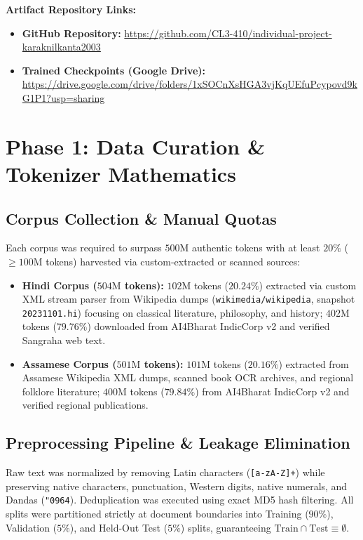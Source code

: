 \documentclass[11pt,a4paper]{article}
\begin{document}
\vspace{0.3em}
\noindent\textbf{Artifact Repository Links:}
\begin{itemize}[noitemsep,topsep=0pt]
    \item \textbf{GitHub Repository:} \url{https://github.com/CL3-410/individual-project-karaknilkanta2003}
    \item \textbf{Trained Checkpoints (Google Drive):} \url{https://drive.google.com/drive/folders/1xSOCnXsHGA3vjKqUEfuPcypovd9kG1P1?usp=sharing}
\end{itemize}

\vspace{0.5em}

\section{Phase 1: Data Curation \& Tokenizer Mathematics}

\subsection{Corpus Collection \& Manual Quotas}
Each corpus was required to surpass $500\text{M}$ authentic tokens with at least $20\%$ ($\ge 100\text{M}$ tokens) harvested via custom-extracted or scanned sources:
\begin{itemize}[noitemsep]
    \item \textbf{Hindi Corpus ($504\text{M}$ tokens):} $102\text{M}$ tokens ($20.24\%$) extracted via custom XML stream parser from Wikipedia dumps (\texttt{wikimedia/wikipedia}, snapshot \texttt{20231101.hi}) focusing on classical literature, philosophy, and history; $402\text{M}$ tokens ($79.76\%$) downloaded from AI4Bharat IndicCorp v2 and verified Sangraha web text.
    \item \textbf{Assamese Corpus ($501\text{M}$ tokens):} $101\text{M}$ tokens ($20.16\%$) extracted from Assamese Wikipedia XML dumps, scanned book OCR archives, and regional folklore literature; $400\text{M}$ tokens ($79.84\%$) from AI4Bharat IndicCorp v2 and verified regional publications.
\end{itemize}

\subsection{Preprocessing Pipeline \& Leakage Elimination}
Raw text was normalized by removing Latin characters (\texttt{[a-zA-Z]+}) while preserving native characters, punctuation, Western digits, native numerals, and Dandas (\texttt{\char"0964}). Deduplication was executed using exact MD5 hash filtering. All splits were partitioned strictly at document boundaries into Training ($90\%$), Validation ($5\%$), and Held-Out Test ($5\%$) splits, guaranteeing $\text{Train} \cap \text{Test} \equiv \emptyset$.
\end{document}
